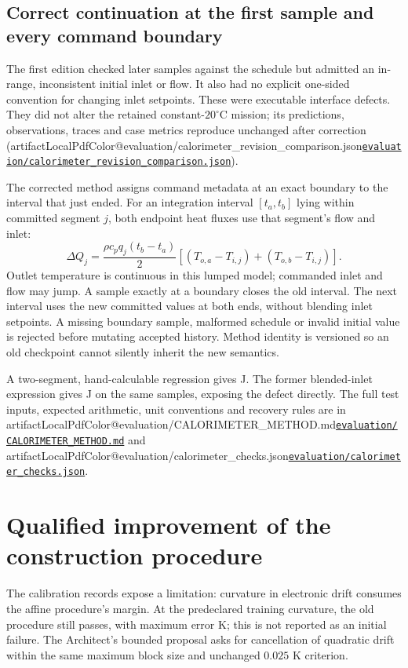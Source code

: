 \documentclass[11pt,letterpaper]{article}
\makeatletter
\newcommand{\artifact}[1]{\begingroup\ifcsname artifactLocalPdfColor@#1\endcsname\hypersetup{urlcolor=cyan}\fi\href{\csname artifacturl@#1\endcsname}{\nolinkurl{#1}}\endgroup}
\makeatother
\begin{document}
\subsection{Correct continuation at the first sample and every command boundary}
The first edition checked later samples against the schedule but admitted an in-range, inconsistent initial inlet or flow. It also had no explicit one-sided convention for changing inlet setpoints. These were executable interface defects. They did not alter the retained constant-$20^{\circ}$C mission; its predictions, observations, traces and case metrics reproduce unchanged after correction (\artifact{evaluation/calorimeter_revision_comparison.json}).

The corrected method assigns command metadata at an exact boundary to the interval that just ended. For an integration interval $[t_a,t_b]$ lying within committed segment $j$, both endpoint heat fluxes use that segment's flow and inlet:
\begin{equation}
\Delta Q_j=\frac{\rho c_p q_j(t_b-t_a)}{2}
\left[(T_{o,a}-T_{i,j})+(T_{o,b}-T_{i,j})\right].
\label{eq:boundaryintegral}
\end{equation}
Outlet temperature is continuous in this lumped model; commanded inlet and flow may jump. A sample exactly at a boundary closes the old interval. The next interval uses the new committed values at both ends, without blending inlet setpoints. A missing boundary sample, malformed schedule or invalid initial value is rejected before mutating accepted history. Method identity is versioned so an old checkpoint cannot silently inherit the new semantics.

A two-segment, hand-calculable regression gives \BoundaryCorrect{} J. The former blended-inlet expression gives \BoundaryOld{} J on the same samples, exposing the defect directly. The full test inputs, expected arithmetic, unit conventions and recovery rules are in \artifact{evaluation/CALORIMETER_METHOD.md} and \artifact{evaluation/calorimeter_checks.json}.



\section{Qualified improvement of the construction procedure}
\label{sec:rsi}
The calibration records expose a limitation: curvature in electronic drift consumes the affine procedure's margin. At the predeclared training curvature, the old procedure still passes, with maximum error \OldRSITrain{} K; this is not reported as an initial failure. The Architect's bounded proposal asks for cancellation of quadratic drift within the same maximum block size and unchanged $0.025$ K criterion.
\end{document}
